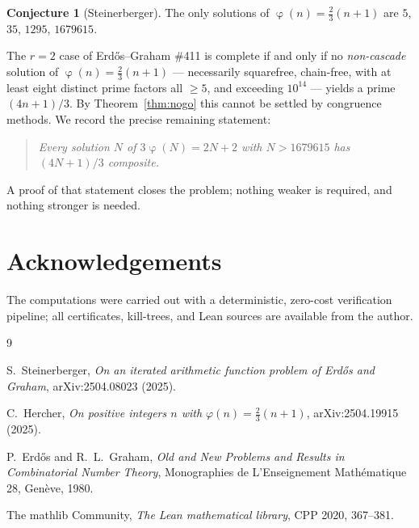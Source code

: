 \documentclass[11pt,reqno]{amsart}
\theoremstyle{plain}
\theoremstyle{definition}
\newtheorem{conjecture}[theorem]{Conjecture}
\DeclareMathOperator{\tot}{\varphi}
\begin{document}
\begin{conjecture}[Steinerberger]
The only solutions of $\tot(n)=\tfrac23(n+1)$ are $5$, $35$, $1295$, $1679615$.
\end{conjecture}

The $r=2$ case of Erd\H{o}s--Graham \#411 is complete if and only if no \emph{non-cascade}
solution of $\tot(n)=\tfrac23(n+1)$ --- necessarily squarefree, chain-free, with at least eight
distinct prime factors all $\ge5$, and exceeding $10^{14}$ --- yields a prime $(4n+1)/3$. By
Theorem~\ref{thm:nogo} this cannot be settled by congruence methods. We record the precise
remaining statement:

\begin{quote}
\emph{Every solution $N$ of $3\tot(N)=2N+2$ with $N>1679615$ has $(4N+1)/3$ composite.}
\end{quote}

A proof of that statement closes the problem; nothing weaker is required, and nothing stronger
is needed.

\section*{Acknowledgements}
The computations were carried out with a deterministic, zero-cost verification pipeline; all
certificates, kill-trees, and Lean sources are available from the author.

\begin{thebibliography}{9}

 S.~Steinerberger, \emph{On an iterated arithmetic function problem of
Erd\H{o}s and Graham}, arXiv:2504.08023 (2025).

 C.~Hercher, \emph{On positive integers $n$ with $\varphi(n)=\tfrac23(n+1)$},
arXiv:2504.19915 (2025).

 P.~Erd\H{o}s and R.~L.~Graham, \emph{Old and New Problems and Results in
Combinatorial Number Theory}, Monographies de L'Enseignement Math\'ematique 28, Gen\`eve, 1980.

 The mathlib Community, \emph{The Lean mathematical library},
CPP 2020, 367--381.

\end{thebibliography}
\end{document}
